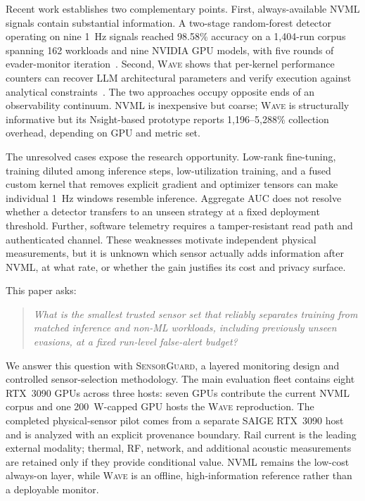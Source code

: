 \documentclass[sigplan,anonymous,review,nonacm]{acmart}
\newcommand{\wave}{\textsc{Wave}}
\newcommand{\system}{\textsc{SensorGuard}}
\begin{document}
Recent work establishes two complementary points. First, always-available NVML signals contain substantial information. A two-stage random-forest detector operating on nine 1~Hz signals reached 98.58\% accuracy on a 1,404-run corpus spanning 162 workloads and nine NVIDIA GPU models, with five rounds of evader-monitor iteration~\cite{rahman2026hidden}. Second, \wave{} shows that per-kernel performance counters can recover LLM architectural parameters and verify execution against analytical constraints~\cite{xu2026wave}. The two approaches occupy opposite ends of an observability continuum. NVML is inexpensive but coarse; \wave{} is structurally informative but its Nsight-based prototype reports 1,196--5,288\% collection overhead, depending on GPU and metric set.

The unresolved cases expose the research opportunity. Low-rank fine-tuning, training diluted among inference steps, low-utilization training, and a fused custom kernel that removes explicit gradient and optimizer tensors can make individual 1~Hz windows resemble inference. Aggregate AUC does not resolve whether a detector transfers to an unseen strategy at a fixed deployment threshold. Further, software telemetry requires a tamper-resistant read path and authenticated channel. These weaknesses motivate independent physical measurements, but it is unknown which sensor actually adds information after NVML, at what rate, or whether the gain justifies its cost and privacy surface.

This paper asks:

\begin{quote}
\emph{What is the smallest trusted sensor set that reliably separates training from matched inference and non-ML workloads, including previously unseen evasions, at a fixed run-level false-alert budget?}
\end{quote}

We answer this question with \system{}, a layered monitoring design and controlled sensor-selection methodology. The main evaluation fleet contains eight RTX~3090 GPUs across three hosts: seven GPUs contribute the current NVML corpus and one 200~W-capped GPU hosts the \wave{} reproduction. The completed physical-sensor pilot comes from a separate SAIGE RTX~3090 host and is analyzed with an explicit provenance boundary. Rail current is the leading external modality; thermal, RF, network, and additional acoustic measurements are retained only if they provide conditional value. NVML remains the low-cost always-on layer, while \wave{} is an offline, high-information reference rather than a deployable monitor.
\end{document}

